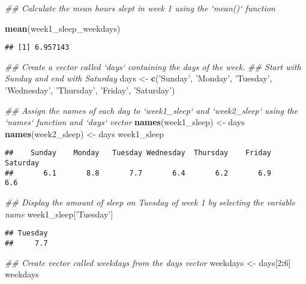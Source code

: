 \documentclass[
]{article}
\newenvironment{Shaded}{\begin{snugshade}}{\end{snugshade}}
\newcommand{\CommentTok}[1]{\textcolor[rgb]{0.56,0.35,0.01}{\textit{#1}}}
\newcommand{\DecValTok}[1]{\textcolor[rgb]{0.00,0.00,0.81}{#1}}
\newcommand{\KeywordTok}[1]{\textcolor[rgb]{0.13,0.29,0.53}{\textbf{#1}}}
\newcommand{\NormalTok}[1]{#1}
\newcommand{\OperatorTok}[1]{\textcolor[rgb]{0.81,0.36,0.00}{\textbf{#1}}}
\newcommand{\StringTok}[1]{\textcolor[rgb]{0.31,0.60,0.02}{#1}}
\begin{document}
\begin{Shaded}
\begin{Highlighting}[]
\CommentTok{## Calculate the mean hours slept in week 1 using the `mean()` function}

\KeywordTok{mean}\NormalTok{(week1_sleep_weekdays)}
\end{Highlighting}
\end{Shaded}

\begin{verbatim}
## [1] 6.957143
\end{verbatim}

\begin{Shaded}
\begin{Highlighting}[]
\CommentTok{## Create a vector called `days` containing the days of the week.}
\CommentTok{## Start with Sunday and end with Saturday}
\NormalTok{days <-}\StringTok{ }\KeywordTok{c}\NormalTok{(}\StringTok{'Sunday'}\NormalTok{, }\StringTok{'Monday'}\NormalTok{, }\StringTok{'Tuesday'}\NormalTok{, }\StringTok{'Wednesday'}\NormalTok{, }\StringTok{'Thursday'}\NormalTok{, }\StringTok{'Friday'}\NormalTok{, }\StringTok{'Saturday'}\NormalTok{)}

\CommentTok{## Assign the names of each day to `week1_sleep` and `week2_sleep` using the `names` function and `days` vector}
\KeywordTok{names}\NormalTok{(week1_sleep) <-}\StringTok{ }\NormalTok{days}
\KeywordTok{names}\NormalTok{(week2_sleep) <-}\StringTok{ }\NormalTok{days}
\NormalTok{week1_sleep}
\end{Highlighting}
\end{Shaded}

\begin{verbatim}
##    Sunday    Monday   Tuesday Wednesday  Thursday    Friday  Saturday 
##       6.1       8.8       7.7       6.4       6.2       6.9       6.6
\end{verbatim}

\begin{Shaded}
\begin{Highlighting}[]
\CommentTok{## Display the amount of sleep on Tuesday of week 1 by selecting the variable name}
\NormalTok{week1_sleep[}\StringTok{'Tuesday'}\NormalTok{]}
\end{Highlighting}
\end{Shaded}

\begin{verbatim}
## Tuesday 
##     7.7
\end{verbatim}

\begin{Shaded}
\begin{Highlighting}[]
\CommentTok{## Create vector called weekdays from the days vector}
\NormalTok{weekdays <-}\StringTok{ }\NormalTok{days[}\DecValTok{2}\OperatorTok{:}\DecValTok{6}\NormalTok{]}
\NormalTok{weekdays}
\end{Highlighting}
\end{Shaded}
\end{document}
